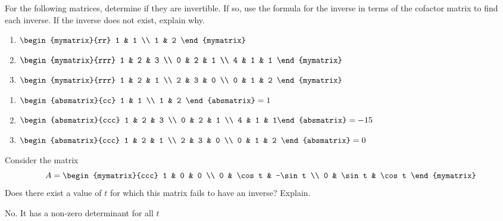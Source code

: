 \begin{enumialphparenastyle}
\begin{ex} For the following matrices, determine if they are invertible. If so, use the formula for the inverse in terms of the cofactor matrix to
  find each inverse. If the inverse does not exist, explain why. 
  \begin{enumerate}
  \item
    $\begin{mymatrix}{rr}
      1 & 1 \\
      1 & 2
    \end{mymatrix}$
  \item
    $\begin{mymatrix}{rrr}
      1 & 2 & 3 \\
      0 & 2 & 1 \\
      4 & 1 & 1
    \end{mymatrix}$
  \item
    $\begin{mymatrix}{rrr}
      1 & 2 & 1 \\
      2 & 3 & 0 \\
      0 & 1 & 2
    \end{mymatrix} $
  \end{enumerate}
  \begin{sol}
    \begin{enumerate}
    \item $\begin{absmatrix}{cc}
        1 & 1 \\
        1 & 2
      \end{absmatrix}= 1$
    \item $\begin{absmatrix}{ccc}
        1 & 2 & 3 \\
        0 & 2 & 1 \\
        4 & 1 & 1%
      \end{absmatrix}= -15$
    \item $\begin{absmatrix}{ccc}
        1 & 2 & 1 \\
        2 & 3 & 0 \\
        0 & 1 & 2
      \end{absmatrix}= 0$
    \end{enumerate}
  \end{sol}
\end{ex}

\begin{ex} Consider the matrix 
  \begin{equation*}
    A = 
    \begin{mymatrix}{ccc}
      1 & 0 & 0 \\
      0 & \cos t & -\sin t \\
      0 & \sin t & \cos t
    \end{mymatrix}
  \end{equation*}
  Does there exist a value of $t$ for which this matrix fails to have an
  inverse? Explain.
  \begin{sol}
    No. It has a non-zero determinant for all $t$
  \end{sol}
\end{ex}



\end{enumialphparenastyle}
